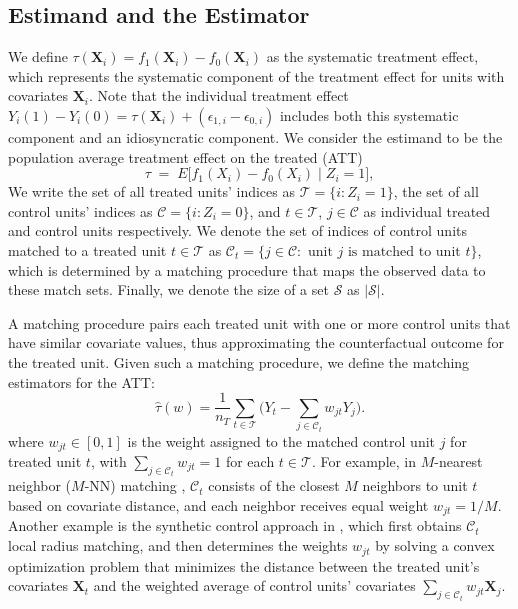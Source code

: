\documentclass{mytemplate}
\begin{document}
\subsection{Estimand and the Estimator}
\label{sec:estimand}
We define $\tau(\mathbf{X}_i) = f_1(\mathbf{X}_i) - f_0(\mathbf{X}_i)$ as the systematic treatment effect, which represents the systematic component of the treatment effect for units with covariates $\mathbf{X}_i$. Note that the individual treatment effect $Y_i(1) - Y_i(0) = \tau(\mathbf{X}_i) + (\epsilon_{1,i} - \epsilon_{0,i})$ includes both this systematic component and an idiosyncratic component.
We consider the estimand to be the population average treatment effect on the treated (ATT)
\[
    \tau \;=\; E\bigl[f_1(X_i) - f_0(X_i)\mid Z_i = 1\bigr],
\]
We write the set of all treated units' indices as $\mathcal{T} = \{i: Z_i=1\}$, the set of all control units' indices as $\mathcal{C} = \{i: Z_i=0\}$, and $t \in \mathcal{T}$, $j \in  \mathcal{C}$ as individual treated and control units respectively. We denote the set of indices of control units matched to a treated unit $t \in \mathcal{T}$ as $\mathcal{C}_t = \{j \in \mathcal{C}: \text{ unit } j \text{ is matched to unit } t\}$, which is determined by a matching procedure that maps the observed data to these match sets.
Finally, we denote the size of a set $\mathcal{S}$ as $|\mathcal{S}|$.

A matching procedure pairs each treated unit with one or more control units that have similar covariate values, thus approximating the counterfactual outcome for the treated unit. Given such a matching procedure, we define the matching estimators for the ATT:
\begin{equation}
\label{eq:matching-estimator}
    \hat{\tau}(w) = \frac{1}{n_T} \sum_{t \in \mathcal{T}} \big(Y_t - \sum_{j \in \mathcal{C}_t} w_{jt} Y_j \big).
\end{equation}
where $w_{jt} \in [0,1]$ is the weight assigned to the matched control unit $j$ for treated unit $t$, with $\sum_{j \in \mathcal{C}_t} w_{jt} = 1$ for each $t \in \mathcal{T}$. For example, in $M$-nearest neighbor ($M$-NN) matching \citep{rubin1973matching, abadie2006large, stuart2010matching}, $\mathcal{C}_t$ consists of the closest $M$ neighbors to unit $t$ based on covariate distance, and each neighbor receives equal weight $w_{jt} = 1/M$. Another example is the synthetic control approach in \cite{che2024caliper}, which first obtains $\mathcal{C}_t$ local radius matching, and then determines the weights $w_{jt}$ by solving a convex optimization problem that minimizes the distance between the treated unit's covariates $\mathbf{X}_t$ and the weighted average of control units' covariates $\sum_{j \in \mathcal{C}_t} w_{jt} \mathbf{X}_j$.
\end{document}
